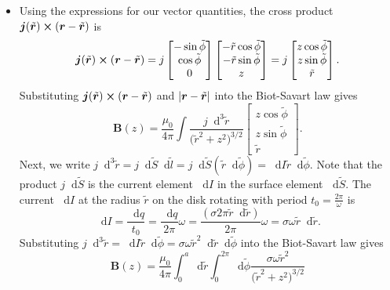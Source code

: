 \documentclass[11pt, a4paper]{article}
\newcommand{\diff}{\mathop{}\!\mathrm{d}} %
\renewcommand{\vec}[1]{\bm{#1}} %
\newcommand{\tvec}[1]{\tilde{\vec{#1}}} %
\renewcommand{\t}[1]{\tilde{#1}} %
\renewcommand{\r}{\vec{r}}
\newcommand{\B}{\vec{B}}  %
\begin{document}
\begin{itemize}
	\item Using the expressions for our vector quantities, the cross product $ \vec{j}(\tvec{r}) \cross (\r - \tvec{r}) $ is
	\begin{equation*}
		\vec{j}(\tvec{r}) \cross (\r - \tvec{r}) = j
		\begin{bmatrix}
			-\sin \t{\phi}\\
			\cos \t{\phi}\\
			0
		\end{bmatrix}
		\begin{bmatrix}
			-\tilde{r} \cos \tilde{\phi}\\
			- \tilde{r} \sin \tilde{\phi}\\
			z
		\end{bmatrix}
		= j
		\begin{bmatrix}
			z \cos \t{\phi}\\
			z \sin \t{\phi}\\
			\t{r}
		\end{bmatrix}.
	\end{equation*}
	Substituting $ \vec{j}(\tvec{r}) \cross (\r - \tvec{r}) $ and $  \abs{\r - \tvec{r}} $ into the Biot-Savart law gives
	\begin{equation*}
		\B(z) = \frac{\mu_{0}}{4 \pi} \int \frac{j \diff^{3} \t{r}}{\big(\tilde{r}^{2} + z^{2}\big)^{3/2}} 
		\begin{bmatrix}
			z \cos \t{\phi}\\
			z \sin \t{\phi}\\
			\t{r}
		\end{bmatrix}.
	\end{equation*}
	Next, we write $ j \diff^{3}\t{r} = j \diff \t{S} \diff \t{l} = j \diff \t{S} (\t{r} \diff \t{\phi} ) = \diff I \t{r} \diff \t{\phi} $. Note that the product $ j \diff \t{S} $ is the current element $ \diff I $ in the surface element $ \diff \tilde{S} $. The current $ \diff I $ at the radius $ \t{r} $ on the disk rotating with period $ t_{0} = \frac{2\pi}{\omega} $ is
	\begin{equation*}
		\diff I = \frac{\diff q}{t_{0}} = \frac{\diff q}{2\pi} \omega  = \frac{(\sigma 2\pi \t{r}\diff \t r)}{2\pi} \omega = \sigma \omega \t{r} \diff \t{r}.
	\end{equation*}
	Substituting $ j \diff^{3}\t{r} =  \diff I \t{r} \diff \t{\phi}  =  \sigma \omega \t{r}^{2} \diff \t{r} \diff \t{\phi}  $ into the Biot-Savart law gives
	\begin{equation*}
		\B(z) = \frac{\mu_{0}}{4 \pi} \int_{0}^{a} \diff \t{r} \int_{0}^{2\pi} \diff \t{\phi}	\frac{\sigma \omega \t{r}^{2}}{\big(\tilde{r}^{2} + z^{2}\big)^{3/2}} 

\end{equation*}
\end{itemize}
\end{document}
